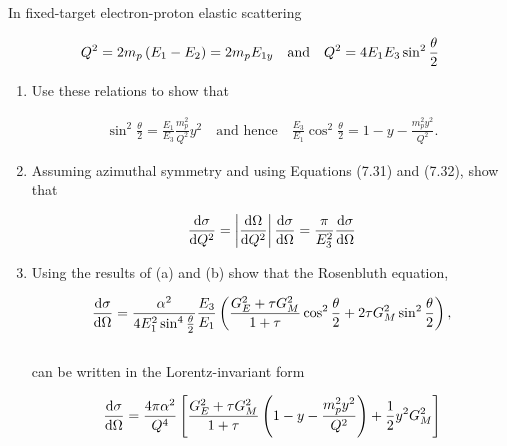 \begin{problem}{8.2}
In fixed-target electron-proton elastic scattering

\begin{align*}
    Q^2 = 2m_p \left(E_1-E_2\right) = 2m_p E_{1y} \quad \text{and} \quad Q^2 = 4E_1E_3 \sin^2 \frac{\theta}{2}
\end{align*}

\begin{enumerate}[label=(\alph*)]
    \item Use these relations to show that 
    
    \begin{align*}
        \sin^2\frac{\theta}{2} = \frac{E_1}{E_3} \frac{m_p^2}{Q^2} y^2 \quad \text{and hence} \quad \frac{E_3}{E_1}\cos^2\frac{\theta}{2} = 1-y - \frac{m_p^2 y^2}{Q^2}.
    \end{align*}

    \item Assuming azimuthal symmetry and using Equations (7.31) and (7.32), show that
    
    \begin{align*}
        \frac{\dif \sigma}{\dif Q^2} = \left|  \frac{\dif \Omega}{\dif Q^2} \right| \frac{\dif \sigma }{\dif \Omega} = \frac{\pi}{E_3^2} \frac{\dif\sigma}{\dif\Omega}
    \end{align*}

    \item Using the results of (a) and (b) show that the Rosenbluth equation,
    
    \begin{align*}
        \frac{\mathop{}\!\mathrm{d}\sigma}{\mathop{}\!\mathrm{d}\Omega} = \frac{\alpha^2}{4E_1^2 \sin^4\frac{\theta}{2}} \frac{E_3}{E_1} \left( \frac{G_E^2+\tau G_M^2}{1+\tau} \cos^2 \frac{\theta}{2} + 2\tau G_M^2 \sin^2\frac{\theta}{2} \right),
    \end{align*}\\
    can be written in the Lorentz-invariant form

    \begin{align*}
        \frac{\mathop{}\!\mathrm{d}\sigma}{\mathop{}\!\mathrm{d}\Omega} = \frac{4\pi\alpha^2}{Q^4} \left[ \frac{G_E^2 + \tau G_M^2}{1+\tau} \left( 1 - y - \frac{m_p^2 y^2}{Q^2} \right) + \frac{1}{2}y^2 G_M^2 \right]
    \end{align*}
\end{enumerate}
\end{problem}
\begin{solution}

\end{solution}

